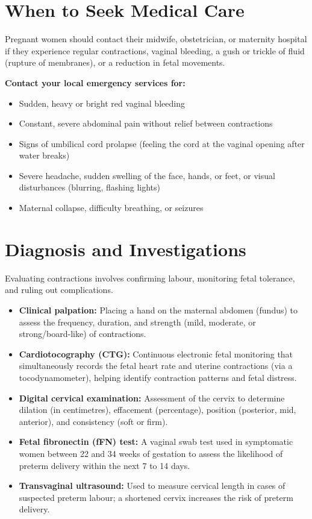 \section*{When to Seek Medical Care}
Pregnant women should contact their midwife, obstetrician, or maternity hospital if they experience regular contractions, vaginal bleeding, a gush or trickle of fluid (rupture of membranes), or a reduction in fetal movements.

\textbf{Contact your local emergency services for:}
\begin{itemize}
    \item Sudden, heavy or bright red vaginal bleeding
    \item Constant, severe abdominal pain without relief between contractions
    \item Signs of umbilical cord prolapse (feeling the cord at the vaginal opening after water breaks)
    \item Severe headache, sudden swelling of the face, hands, or feet, or visual disturbances (blurring, flashing lights)
    \item Maternal collapse, difficulty breathing, or seizures
\end{itemize}

\section*{Diagnosis and Investigations}
Evaluating contractions involves confirming labour, monitoring fetal tolerance, and ruling out complications.
\begin{itemize}
    \item \textbf{Clinical palpation:} Placing a hand on the maternal abdomen (fundus) to assess the frequency, duration, and strength (mild, moderate, or strong/board-like) of contractions.
    \item \textbf{Cardiotocography (CTG):} Continuous electronic fetal monitoring that simultaneously records the fetal heart rate and uterine contractions (via a tocodynamometer), helping identify contraction patterns and fetal distress.
    \item \textbf{Digital cervical examination:} Assessment of the cervix to determine dilation (in centimetres), effacement (percentage), position (posterior, mid, anterior), and consistency (soft or firm).
    \item \textbf{Fetal fibronectin (fFN) test:} A vaginal swab test used in symptomatic women between 22 and 34 weeks of gestation to assess the likelihood of preterm delivery within the next 7 to 14 days.
    \item \textbf{Transvaginal ultrasound:} Used to measure cervical length in cases of suspected preterm labour; a shortened cervix increases the risk of preterm delivery.
\end{itemize}

